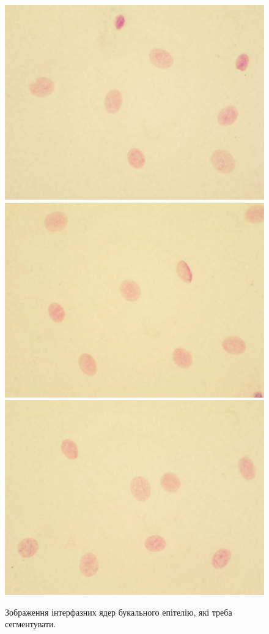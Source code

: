 \begin{figure}[b!]
	\includegraphics[width=0.97\linewidth]{Figures/Chapter2/0a.png}
	\centering
	\endminipage\hfill
	\centering	
	\includegraphics[width=0.97\linewidth]{Figures/Chapter2/0b.png}
	\endminipage\hfill
	\centering	
	\includegraphics[width=0.97\linewidth]{Figures/Chapter2/0c.png}
	\endminipage\hfill
	
	\caption{Зображення інтерфазних ядер букального епітелію, які треба сегментувати.}
	\label{fig:raw_cells}
\end{figure}

